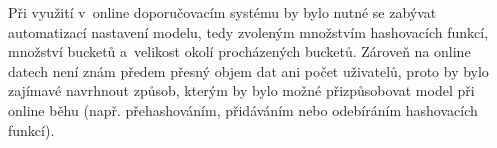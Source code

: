 \documentclass[11pt]{article}
\begin{document}
Při využití v~online doporučovacím systému by bylo nutné se zabývat automatizací nastavení modelu, tedy zvoleným množstvím hashovacích funkcí, množství bucketů a~velikost okolí procházených bucketů. Zároveň na online datech není znám předem přesný objem dat ani počet uživatelů, proto by bylo zajímavé navrhnout způsob, kterým by bylo možné přizpůsobovat model při online běhu (např. přehashováním, přidáváním nebo odebíráním hashovacích funkcí). 
	
 
\clearpage
\thispagestyle{empty}


\end{document}
